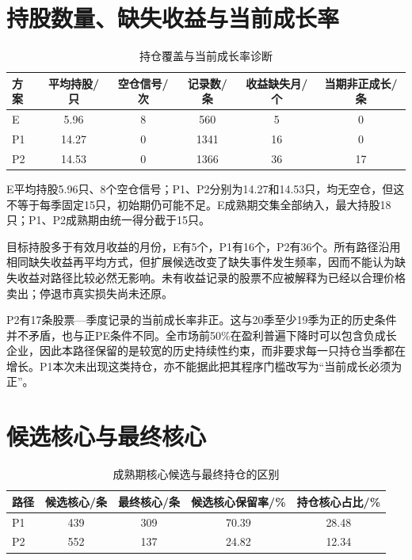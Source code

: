 \section{持股数量、缺失收益与当前成长率}
\begin{table}[htbp]
\centering
\caption{持仓覆盖与当前成长率诊断}
\renewcommand{\arraystretch}{1.18}
\small
\setlength{\tabcolsep}{4.5pt}
\begin{tabularx}{\textwidth}{@{}p{1.55cm}*{5}{C}@{}}
\toprule
方案 & 平均持股/只 & 空仓信号/次 & 记录数/条 & 收益缺失月/个 & 当期非正成长/条 \\
\midrule
E & 5.96 & 8 & 560 & 5 & 0 \\
P1 & 14.27 & 0 & 1341 & 16 & 0 \\
P2 & 14.53 & 0 & 1366 & 36 & 17 \\
\bottomrule
\end{tabularx}
\end{table}

E平均持股5.96只、8个空仓信号；P1、P2分别为14.27和14.53只，均无空仓，但这不等于每季固定15只，初始期仍可能不足。E成熟期交集全部纳入，最大持股18只；P1、P2成熟期由统一得分截于15只。

目标持股多于有效月收益的月份，E有5个，P1有16个，P2有36个。所有路径沿用相同缺失收益再平均方式，但扩展候选改变了缺失事件发生频率，因而不能认为缺失收益对路径比较必然无影响。未有收益记录的股票不应被解释为已经以合理价格卖出；停退市真实损失尚未还原。

P2有17条股票—季度记录的当前成长率非正。这与20季至少19季为正的历史条件并不矛盾，也与正PE条件不同。全市场前50\%在盈利普遍下降时可以包含负成长企业，因此本路径保留的是较宽的历史持续性约束，而非要求每一只持仓当季都在增长。P1本次未出现这类持仓，亦不能据此把其程序门槛改写为“当前成长必须为正”。

\section{候选核心与最终核心}
\begin{table}[htbp]
\centering
\caption{成熟期核心候选与最终持仓的区别}
\renewcommand{\arraystretch}{1.18}
\small
\setlength{\tabcolsep}{4.5pt}
\begin{tabularx}{\textwidth}{@{}p{1.55cm}*{4}{C}@{}}
\toprule
路径 & 候选核心/条 & 最终核心/条 & 候选核心保留率/\% & 持仓核心占比/\% \\
\midrule
P1 & 439 & 309 & 70.39 & 28.48 \\
P2 & 552 & 137 & 24.82 & 12.34 \\
\bottomrule
\end{tabularx}
\end{table}

